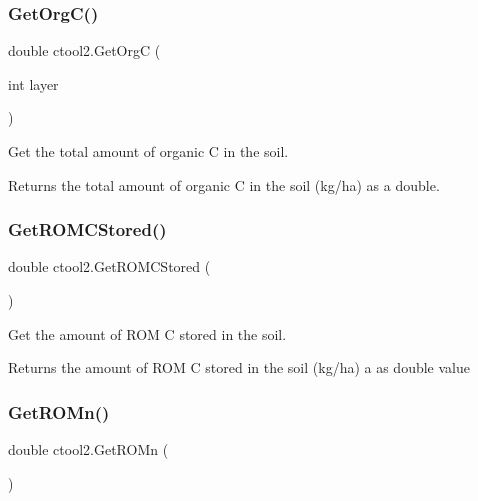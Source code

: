 \subsubsection{\texorpdfstring{GetOrgC()}{GetOrgC()}}
{\footnotesize\ttfamily double ctool2.\+Get\+OrgC (\begin{DoxyParamCaption}\item[{int}]{layer }\end{DoxyParamCaption})\hspace{0.3cm}{\ttfamily [inline]}}



Get the total amount of organic C in the soil. 

\begin{DoxyReturn}{Returns}
the total amount of organic C in the soil (kg/ha) as a double. 
\end{DoxyReturn}
\mbox{\label{classctool2_a88804d7d3fe9b3132085ce9db3c16b80}} 
\subsubsection{\texorpdfstring{GetROMCStored()}{GetROMCStored()}}
{\footnotesize\ttfamily double ctool2.\+Get\+R\+O\+M\+C\+Stored (\begin{DoxyParamCaption}{ }\end{DoxyParamCaption})\hspace{0.3cm}{\ttfamily [inline]}}



Get the amount of R\+OM C stored in the soil. 

\begin{DoxyReturn}{Returns}
the amount of R\+OM C stored in the soil (kg/ha) a as double value 
\end{DoxyReturn}
\mbox{\label{classctool2_a31a62472fb74dbafbc296ecd074c8d5e}} 
\subsubsection{\texorpdfstring{GetROMn()}{GetROMn()}}
{\footnotesize\ttfamily double ctool2.\+Get\+R\+O\+Mn (\begin{DoxyParamCaption}{ }\end{DoxyParamCaption})\hspace{0.3cm}{\ttfamily [inline]}}



